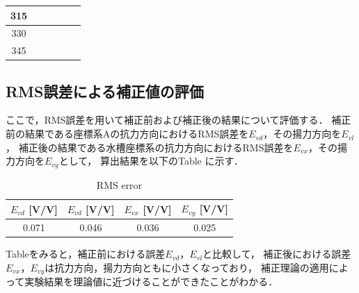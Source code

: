 \begin{table}[htbp]
\begin{center}
\begin{tabular}{|p{20mm}|p{20mm}|p{20mm}|p{20mm}|p{20mm}|p{20mm}|}
            \multicolumn{1}{|c|}{315}                     & \multicolumn{1}{|r|}{}                        & \multicolumn{1}{|r|}{}                   & \multicolumn{1}{|r|}{}                    & \multicolumn{1}{|r|}{}                   & \multicolumn{1}{|r|}{}                         \\ \hline
            \multicolumn{1}{|c|}{330}                     & \multicolumn{1}{|r|}{}                        & \multicolumn{1}{|r|}{}                   & \multicolumn{1}{|r|}{}                    & \multicolumn{1}{|r|}{}                   & \multicolumn{1}{|r|}{}                         \\ \hline
            \multicolumn{1}{|c|}{345}                     & \multicolumn{1}{|r|}{}                        & \multicolumn{1}{|r|}{}                   & \multicolumn{1}{|r|}{}                    & \multicolumn{1}{|r|}{}                   & \multicolumn{1}{|r|}{}                         \\ \hline
        \end{tabular}
    \end{center}
\end{table}

\subsection{RMS誤差による補正値の評価}

ここで，RMS誤差を用いて補正前および補正後の結果について評価する．
補正前の結果である座標系Aの抗力方向におけるRMS誤差を$E_{vd}$，その揚力方向を$E_{vl}$，
補正後の結果である水槽座標系の抗力方向におけるRMS誤差を$E_{vx}$，その揚力方向を$E_{vy}$として，
算出結果を以下のTable に示す．

\begin{table}[htbp]
  \begin{center}
      \caption{RMS error}
      \begin{tabular}{|p{20mm}|p{20mm}p{20mm}|p{20mm}|}
          \hline
          \multicolumn{1}{|c|}{$E_{vd}$ [V/V]} & \multicolumn{1}{|c|}{$E_{vd}$ [V/V]} & \multicolumn{1}{|c|}{$E_{vx}$ [V/V]} & \multicolumn{1}{|c|}{$E_{vy}$ [V/V]} \\ \hline
          \multicolumn{1}{|c|}{0.071}          & \multicolumn{1}{|c|}{0.046}          & \multicolumn{1}{|c|}{0.036}          & \multicolumn{1}{|c|}{0.025}            \\ \hline
      \end{tabular}
  \end{center}
\end{table}

Tableをみると，補正前における誤差$E_{vd}$，$E_{vl}$と比較して，
補正後における誤差$E_{vx}$，$E_{vy}$は抗力方向，揚力方向ともに小さくなっており，
補正理論の適用によって実験結果を理論値に近づけることができたことがわかる．